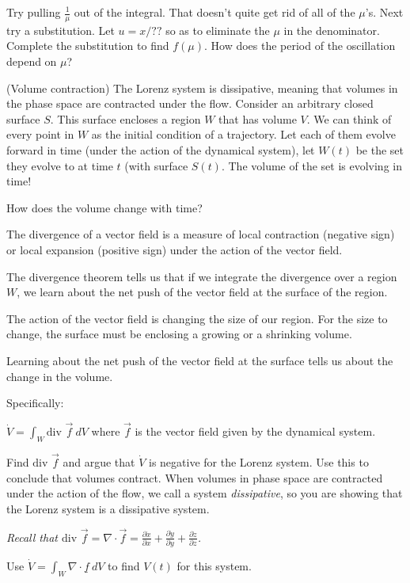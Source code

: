 \documentclass[12pt,letterpaper,noanswers]{exam}
\begin{document}
\begin{questions}
\begin{parts}
Try pulling $\frac{1}{\mu}$ out of the integral.  That doesn't quite get rid of all of the $\mu$'s.  Next try a substitution.  Let $u = x/??$ so as to eliminate the $\mu$ in the denominator.  Complete the substitution to find $f(\mu)$.  How does the period of the oscillation depend on $\mu$?

\end{parts}

\item (Volume contraction) The Lorenz system is dissipative, meaning that volumes in the phase space are contracted under the flow.  Consider an arbitrary closed surface $S$.  This surface encloses a region $W$ that has volume $V$.  We can think of every point in $W$ as the initial condition of a trajectory.  Let each of them evolve forward in time (under the action of the dynamical system), let $W(t)$ be the set they evolve to at time $t$ (with surface $S(t)$.  The volume of the set is evolving in time!


How does the volume change with time?  

The divergence of a vector field is a measure of local contraction (negative sign) or local expansion (positive sign) under the action of the vector field.

The divergence theorem tells us that if we integrate the divergence over a region $W$, we learn about the net push of the vector field at the surface of the region.  

The action of the vector field is changing the size of our region.  For the size to change, the surface must be enclosing a growing or a shrinking volume.

Learning about the net push of the vector field at the surface tells us about the change in the volume.

Specifically:

$\displaystyle \dot{V} = \int_W \text{div }\vec{f}\ dV$ where $\vec f$ is the vector field given by the dynamical system.  
\begin{parts}
\item Find $\text{div }\vec f$ and argue that $\dot{V}$ is negative for the Lorenz system.  Use this to conclude that volumes contract.  When volumes in phase space are contracted under the action of the flow, we call a system \emph{dissipative}, so you are showing that the Lorenz system is a dissipative system.

\emph{Recall that $\text{div }\vec f = \nabla \cdot \vec f = \frac{\partial \dot x}{\partial x} + \frac{\partial \dot y}{\partial y} + \frac{\partial \dot z}{\partial z}$.}

\item Use $\dot V = \int_W \nabla \cdot \underline{f}\ dV$ to find $V(t)$ for this system.

\end{parts}

\end{questions}
\end{document}
